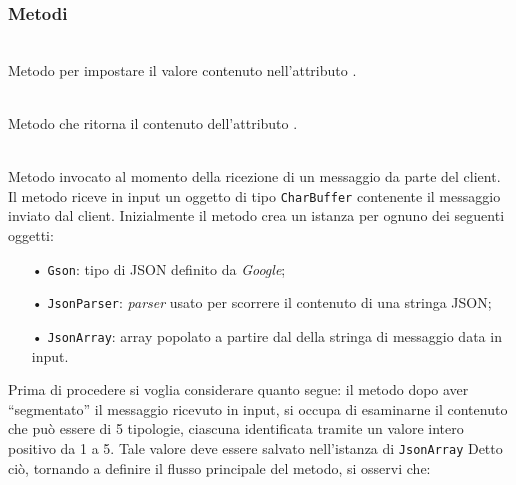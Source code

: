 
\subsubsection*{Metodi}
\begin{description}

	\item{}\\
	Metodo per impostare il valore contenuto nell'attributo .
	
	\item{}\\
	Metodo che ritorna il contenuto dell'attributo .
	
	\item{}\\
	Metodo invocato al momento della ricezione di un messaggio da parte del client. Il metodo riceve in input un oggetto di tipo \texttt{CharBuffer} contenente il messaggio inviato dal client.
Inizialmente il metodo crea un istanza per ognuno dei seguenti oggetti:
	\begin{itemize}
		\item[•]\texttt{Gson}: tipo di JSON definito da \textit{Google};
		\item[•]\texttt{JsonParser}: \textit{parser} usato per scorrere il contenuto di una stringa JSON;
		\item[•]\texttt{JsonArray}: array popolato a partire dal  della stringa di messaggio data in input.
	\end{itemize}
	
	Prima di procedere si voglia considerare quanto segue: il metodo dopo aver ``segmentato'' il messaggio ricevuto in input, si occupa di esaminarne il contenuto che può essere di 5 tipologie, ciascuna identificata tramite un valore intero positivo da 1 a 5. Tale valore deve essere salvato nell'istanza di \texttt{JsonArray}
	Detto ciò, tornando a definire il flusso principale del metodo, si osservi che:


\end{description}
